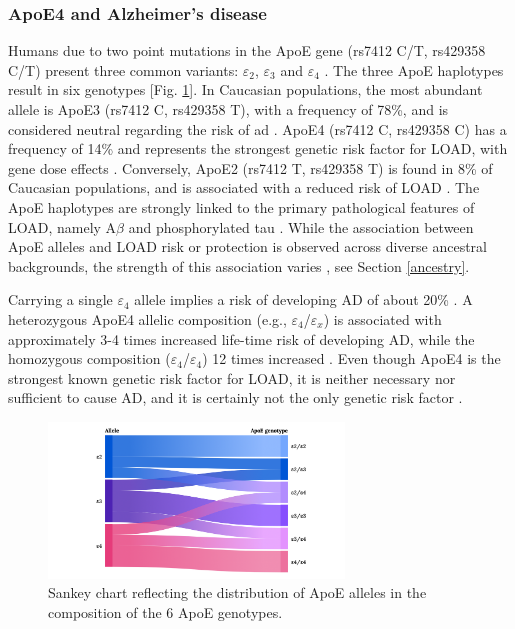 \documentclass{amsart}
\begin{document}
\subsubsection{ApoE4 and Alzheimer's disease}
Humans due to two point mutations in the ApoE gene (rs7412 C/T, rs429358 C/T) present three common variants: $\varepsilon_2$, $\varepsilon_3$ and $\varepsilon_4$ \cite{Husain2021APOETherapeutics, Yang2023ApolipoproteinDisease}. The three ApoE haplotypes result in six genotypes [Fig. \ref{fig1}]. In Caucasian populations, the most abundant allele is ApoE3 (rs7412 C, rs429358 T), with a frequency of 78\%, and is considered neutral regarding the risk of \acrshort{ad} \cite{Liu2013ApolipoproteinTherapy}. ApoE4 (rs7412 C, rs429358 C) has a frequency of 14\% and represents the strongest genetic risk factor for LOAD, with gene dose effects \cite{Strittmatter1993ApolipoproteinDisease}. Conversely, ApoE2 (rs7412 T, rs429358 T) is found in 8\% of Caucasian populations, and is associated with a reduced risk of LOAD \cite{Liu2013ApolipoproteinTherapy}. The ApoE haplotypes are strongly linked to the primary pathological features of LOAD, namely A$\beta$ and phosphorylated tau \cite{Deming2017Genome-wideModifiers}. While the association between ApoE alleles and LOAD risk or protection is observed across diverse ancestral backgrounds, the strength of this association varies \cite{Belloy2019AForward, Farrer1997EffectsMeta-analysis}, see Section \ref{ancestry}.

Carrying a single $\varepsilon_4$ allele implies a risk of developing AD of about 20\% \cite{Bookheimer2009APOE4GA}. A heterozygous ApoE4 allelic composition (e.g., $\varepsilon_4$/$\varepsilon_x$) is associated with approximately 3-4 times increased life-time risk of developing AD, while the homozygous composition ($\varepsilon_4$/$\varepsilon_4$) 12 times increased \cite{Kim2009TheRO}. Even though ApoE4 is the strongest known genetic risk factor for LOAD, it is neither necessary nor sufficient to cause AD, and it is certainly not the only genetic risk factor \cite{SerranoPozo2019IsAD}.

\begin{figure}[H]
  \includegraphics[width=0.7\textwidth]{figures/ApoE@2x.png}
    \caption{Sankey chart reflecting the distribution of ApoE alleles in the composition of the 6 ApoE genotypes.}
  \label{fig1}
\end{figure}
\end{document}
